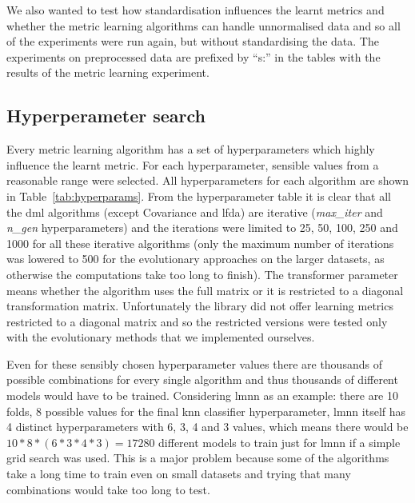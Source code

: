 \documentclass[12pt,a4paper]{report}
\begin{document}
We also wanted to test how standardisation influences the learnt metrics and whether the metric learning algorithms can handle unnormalised data and so all of the experiments were run again, but without standardising the data. The experiments on preprocessed data are prefixed by ``s:'' in the tables with the results of the metric learning experiment.

\subsection{Hyperperameter search} \label{chap:exp:hypsearch}

Every metric learning algorithm has a set of hyperparameters which highly influence the learnt metric. For each hyperparameter, sensible values from a reasonable range were selected. All hyperparameters for each algorithm are shown in Table~\ref{tab:hyperparams}. From the hyperparameter table it is clear that all the \ac{dml} algorithms (except Covariance and \ac{lfda}) are iterative (\textit{max\_iter} and \textit{n\_gen} hyperparameters) and the iterations were limited to 25, 50, 100, 250 and 1000 for all these iterative algorithms (only the maximum number of iterations was lowered to 500 for the evolutionary approaches on the larger datasets, as otherwise the computations take too long to finish). The transformer parameter means whether the algorithm uses the full matrix or it is restricted to a diagonal transformation matrix. Unfortunately the library did not offer learning metrics restricted to a diagonal matrix and so the restricted versions were tested only with the evolutionary methods that we implemented ourselves.



Even for these sensibly chosen hyperparameter values there are thousands of possible combinations for every single algorithm and thus thousands of different models would have to be trained. Considering \ac{lmnn} as an example: there are 10 folds, 8 possible values for the final \ac{knn} classifier hyperparameter, \ac{lmnn} itself has 4 distinct hyperparameters with 6, 3, 4 and 3 values, which means there would be $10*8*(6*3*4*3)=17280$ different models to train just for \ac{lmnn} if a simple grid search was used. This is a major problem because some of the algorithms take a long time to train even on small datasets and trying that many combinations would take too long to test.
\end{document}
